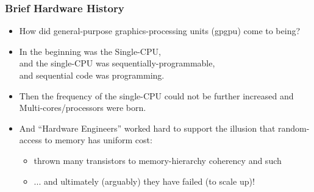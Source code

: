 \documentclass{beamer}
\renewcommand{\emph}[1]{\textcolor{structure}{#1}}
\begin{document}
\begin{frame}
  \frametitle{Brief Hardware History} %
  \centering
\begin{itemize}
    \item How did general-purpose graphics-processing units (\emph{{\sc gpgpu}}) come to being? \bigskip %
    
    \item In the beginning was the \emph{Single-CPU}, \smallskip \\ 
            and the \emph{single-CPU} was sequentially-programmable, \smallskip \\ 
            and sequential code was programming. \bigskip

    \item Then the frequency of the single-CPU could not be further increased and \emph{Multi-cores/processors} were born. \bigskip

    \item And ``Hardware Engineers'' worked hard to support the illusion that random-access to memory has uniform cost: \\ \smallskip
        \begin{itemize}
            \item   thrown many transistors to memory-hierarchy coherency and such\\ \smallskip
            \item   ... and ultimately (arguably) they have failed (to scale up)!
        \end{itemize} \bigskip
%
\end{itemize}
\end{frame}
\end{document}
